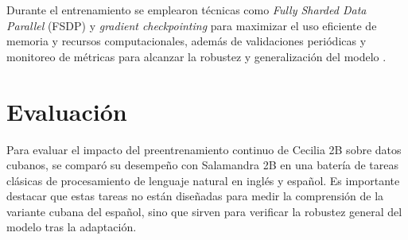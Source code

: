 \documentclass[10pt,twoside]{rcmart} %
\begin{document}
Durante el entrenamiento se emplearon técnicas como \textit{Fully Sharded Data Parallel} (FSDP) y \textit{gradient checkpointing} para maximizar el uso eficiente de memoria y recursos computacionales, además de validaciones periódicas y monitoreo de métricas para alcanzar la robustez y generalización del modelo \cite{lialin2023scaling}.

\section{Evaluación}\label{sec:eval}

Para evaluar el impacto del preentrenamiento continuo de Cecilia 2B sobre datos cubanos, se comparó su desempeño con Salamandra 2B en una batería de tareas clásicas de procesamiento de lenguaje natural en inglés y español. Es importante destacar que estas tareas no están diseñadas para medir la comprensión de la variante cubana del español, sino que sirven para verificar la robustez general del modelo tras la adaptación.
\end{document}
